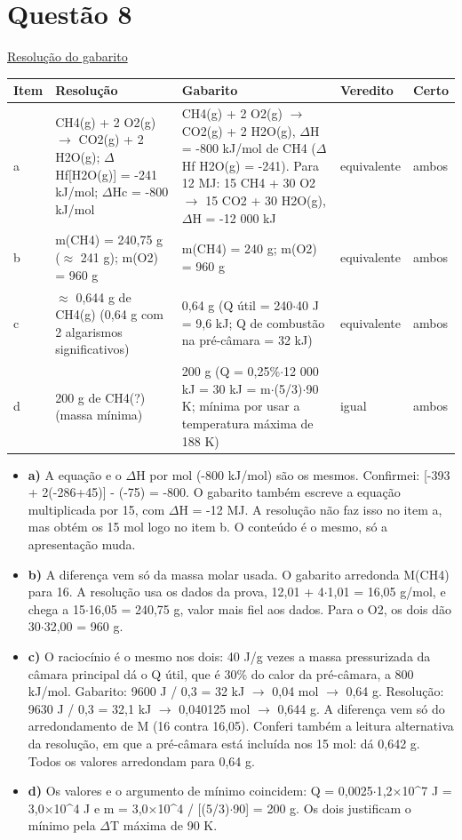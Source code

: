 \documentclass{article}%
\begin{document}
\section*{Questão 8}%
\href{https://poliedroresolve.sistemapoliedro.com.br/vestibulares/ita/2026/ita-2-fase-dia-2-29-10-2025-2-fase-dia-2/dissertativa-8-quimica-2-fase-dia-2-ita-2026}{Resolução do gabarito}\par\smallskip%
\begin{longtable}{@{}p{} p{} p{} p{} p{}@{}}\toprule Item & Resolução & Gabarito & Veredito & Certo \\ \midrule
a & CH4(g) + 2 O2(g) $\to$ CO2(g) + 2 H2O(g); $\Delta$Hf{[}H2O(g){]} = -241 kJ/mol; $\Delta$Hc = -800 kJ/mol & CH4(g) + 2 O2(g) $\to$ CO2(g) + 2 H2O(g), $\Delta$H = -800 kJ/mol de CH4 ($\Delta$Hf H2O(g) = -241). Para 12 MJ: 15 CH4 + 30 O2 $\to$ 15 CO2 + 30 H2O(g), $\Delta$H = -12 000 kJ & equivalente & ambos \\
b & m(CH4) = 240,75 g ($\approx$ 241 g); m(O2) = 960 g & m(CH4) = 240 g; m(O2) = 960 g & equivalente & ambos \\
c & $\approx$ 0,644 g de CH4(g) (0,64 g com 2 algarismos significativos) & 0,64 g (Q útil = 240$\cdot$40 J = 9,6 kJ; Q de combustão na pré{-}câmara = 32 kJ) & equivalente & ambos \\
d & 200 g de CH4(?) (massa mínima) & 200 g (Q = 0,25\%$\cdot$12 000 kJ = 30 kJ = m$\cdot$(5/3)$\cdot$90 K; mínima por usar a temperatura máxima de 188 K) & igual & ambos \\
\bottomrule\end{longtable}%
\begin{itemize}%
\item%
\textbf{a)} A equação e o $\Delta$H por mol (-800 kJ/mol) são os mesmos. Confirmei: {[}-393 + 2(-286+45){]} - (-75) = -800. O gabarito também escreve a equação multiplicada por 15, com $\Delta$H = -12 MJ. A resolução não faz isso no item a, mas obtém os 15 mol logo no item b. O conteúdo é o mesmo, só a apresentação muda.%
\item%
\textbf{b)} A diferença vem só da massa molar usada. O gabarito arredonda M(CH4) para 16. A resolução usa os dados da prova, 12,01 + 4$\cdot$1,01 = 16,05 g/mol, e chega a 15$\cdot$16,05 = 240,75 g, valor mais fiel aos dados. Para o O2, os dois dão 30$\cdot$32,00 = 960 g.%
\item%
\textbf{c)} O raciocínio é o mesmo nos dois: 40 J/g vezes a massa pressurizada da câmara principal dá o Q útil, que é 30\% do calor da pré{-}câmara, a 800 kJ/mol. Gabarito: 9600 J / 0,3 = 32 kJ $\to$ 0,04 mol $\to$ 0,64 g. Resolução: 9630 J / 0,3 = 32,1 kJ $\to$ 0,040125 mol $\to$ 0,644 g. A diferença vem só do arredondamento de M (16 contra 16,05). Conferi também a leitura alternativa da resolução, em que a pré{-}câmara está incluída nos 15 mol: dá 0,642 g. Todos os valores arredondam para 0,64 g.%
\item%
\textbf{d)} Os valores e o argumento de mínimo coincidem: Q = 0,0025$\cdot$1,2$\times$10\^{}7 J = 3,0$\times$10\^{}4 J e m = 3,0$\times$10\^{}4 / {[}(5/3)$\cdot$90{]} = 200 g. Os dois justificam o mínimo pela $\Delta$T máxima de 90 K.%
\end{itemize}%
\end{document}
